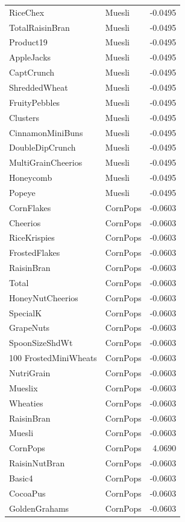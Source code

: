 \begin{longtable}{llr}
RiceChex & Muesli & -0.0495 \\
TotalRaisinBran & Muesli & -0.0495 \\
Product19 & Muesli & -0.0495 \\
AppleJacks & Muesli & -0.0495 \\
CaptCrunch & Muesli & -0.0495 \\
ShreddedWheat & Muesli & -0.0495 \\
FruityPebbles & Muesli & -0.0495 \\
Clusters & Muesli & -0.0495 \\
CinnamonMiniBuns & Muesli & -0.0495 \\
DoubleDipCrunch & Muesli & -0.0495 \\
MultiGrainCheerios & Muesli & -0.0495 \\
Honeycomb & Muesli & -0.0495 \\
Popeye & Muesli & -0.0495 \\
CornFlakes & CornPops & -0.0603 \\
Cheerios & CornPops & -0.0603 \\
RiceKrispies & CornPops & -0.0603 \\
FrostedFlakes & CornPops & -0.0603 \\
RaisinBran & CornPops & -0.0603 \\
Total & CornPops & -0.0603 \\
HoneyNutCheerios & CornPops & -0.0603 \\
SpecialK & CornPops & -0.0603 \\
GrapeNuts & CornPops & -0.0603 \\
SpoonSizeShdWt & CornPops & -0.0603 \\
100%
FrostedMiniWheats & CornPops & -0.0603 \\
NutriGrain & CornPops & -0.0603 \\
Mueslix & CornPops & -0.0603 \\
Wheaties & CornPops & -0.0603 \\
RaisinBran & CornPops & -0.0603 \\
Muesli & CornPops & -0.0603 \\
CornPops & CornPops & 4.0690 \\
RaisinNutBran & CornPops & -0.0603 \\
Basic4 & CornPops & -0.0603 \\
CocoaPus & CornPops & -0.0603 \\
GoldenGrahams & CornPops & -0.0603 \\

\end{longtable}
